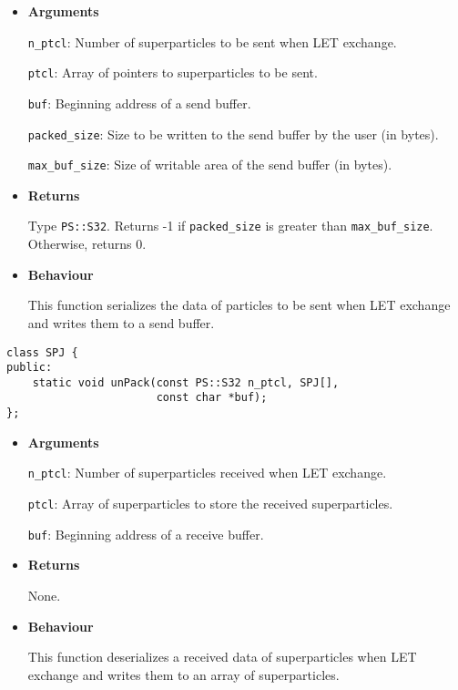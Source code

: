 \begin{itemize}

\item {\bf Arguments}

  \texttt{n\_ptcl}: Number of superparticles to be sent when LET exchange.

  \texttt{ptcl}: Array of pointers to superparticles to be sent. 

  \texttt{buf}: Beginning address of a send buffer. 

  \texttt{packed\_size}: Size to be written to the send buffer by the user (in bytes). 
  
  \texttt{max\_buf\_size}: Size of writable area of the send buffer (in bytes).

\item {\bf Returns}

  Type \texttt{PS::S32}. Returns -1 if \texttt{packed\_size} is greater than \texttt{max\_buf\_size}. Otherwise, returns 0.
  
\item {\bf Behaviour}

 This function serializes the data of particles to be sent when LET exchange and writes them to a send buffer.

\end{itemize}



\begin{screen}
\begin{verbatim}
class SPJ {
public:
    static void unPack(const PS::S32 n_ptcl, SPJ[],
                       const char *buf);
};
\end{verbatim}
\end{screen}

\begin{itemize}

\item {\bf Arguments}

  \texttt{n\_ptcl}: Number of superparticles received when LET exchange. 
                       
  \texttt{ptcl}: Array of superparticles to store the received superparticles.
                       
  \texttt{buf}: Beginning address of a receive buffer.

\item {\bf Returns}

  None.

\item {\bf Behaviour}

 This function deserializes a received data of superparticles when LET exchange and writes them to an array of superparticles.

\end{itemize}
